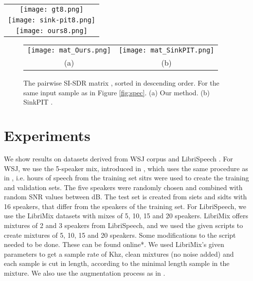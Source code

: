 \documentclass[a4paper]{article}
\begin{document}
\begin{figure*}[t]
\centering
\begin{tabular}{c}
\texttt{[image: gt8.png]} \\
\texttt{[image: sink-pit8.png]} \\
\texttt{[image: ours8.png]} \\
\end{tabular}
\caption{Separation results for a mixture of  speakers. First row: mel spectrogram of ground truth signals. Second row: mel spectrogram of SinkPIT signals. Third row: mel spectrogram of the outputs of our method. The last row shows the SI-SDR improvement for the SinkPIT method and our method. The x-axis is sorted by the SI-SDRi in descending order.}
\label{fig:spec}
\vspace{-.41cm}
\end{figure*}

\begin{figure}[h]
\hspace*{-0.6cm}
\begin{tabular}{cc}
\texttt{[image: mat\_Ours.png]} &
\texttt{[image: mat\_SinkPIT.png]} \\
(a) & (b) \\
\end{tabular}
\vspace{-.25cm}
\caption{The pairwise SI-SDR matrix , sorted in descending order. For the same input sample as in Figure \ref{fig:spec}. (a) Our method. (b) SinkPIT \cite{tachibana2020towards}.}
\vspace{-.65cm}
\label{fig:mat}
\end{figure}

\section{Experiments}
We show results on datasets derived from WSJ corpus \cite{garofolo1993csr} and LibriSpeech \cite{panayotov2015LibriSpeech}. For WSJ, we use the 5-speaker mix, introduced in \cite{nachmani2020voice}, which uses the same procedure as in \cite{hershey2016deep}, i.e.  hours of speech from the training set sitrs were used to create the training and validation sets. The five speakers were randomly chosen and combined with random SNR values between  dB. The test set is created from siets and sidts with 16 speakers, that differ from the speakers of the training set. For LibriSpeech, we use the LibriMix \cite{cosentino2020librimix} datasets with mixes of 5, 10, 15 and 20 speakers. LibriMix offers mixtures of 2 and 3 speakers from LibriSpeech, and we used the given scripts to create mixtures of 5, 10, 15 and 20 speakers. Some modifications to the script needed to be done. These can be found online*. We used LibriMix's given parameters to get a sample rate of Khz, clean mixtures (no noise added) and each sample is cut in length, according to the minimal length sample in the mixture. We also use the augmentation process as in \cite{tachibana2020towards}.
\end{document}
